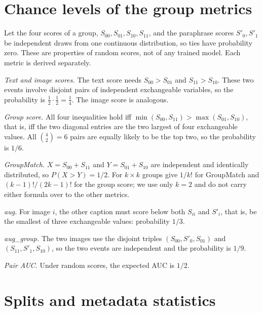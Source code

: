\section{Chance levels of the group metrics}
\label{app:chance}

Let the four scores of a group, $S_{00},S_{01},S_{10},S_{11}$, and the paraphrase scores
$S'_0,S'_1$ be independent draws from one continuous distribution, so ties have probability zero.
These are properties of random scores, not of any trained model. Each metric is derived separately.

\emph{Text and image scores.} The text score needs $S_{00}>S_{01}$ and $S_{11}>S_{10}$. These two
events involve disjoint pairs of independent exchangeable variables, so the probability is
$\tfrac12\cdot\tfrac12=\tfrac14$. The image score is analogous.

\emph{Group score.} All four inequalities hold iff $\min(S_{00},S_{11})>\max(S_{01},S_{10})$, that
is, iff the two diagonal entries are the two largest of four exchangeable values. All
$\binom{4}{2}=6$ pairs are equally likely to be the top two, so the probability is $1/6$.

\emph{GroupMatch.} $X=S_{00}+S_{11}$ and $Y=S_{01}+S_{10}$ are independent and identically
distributed, so $P(X>Y)=1/2$. For $k{\times}k$ groups \citet{zhu2025ttm} give $1/k!$ for GroupMatch
and $(k-1)!/(2k-1)!$ for the group score; we use only $k=2$ and do not carry either formula over to
the other metrics.

\emph{aug.} For image $i$, the other caption must score below both $S_{ii}$ and $S'_i$, that is, be
the smallest of three exchangeable values: probability $1/3$.

\emph{aug\_group.} The two images use the disjoint triples $(S_{00},S'_0,S_{01})$ and
$(S_{11},S'_1,S_{10})$, so the two events are independent and the probability is $1/9$.

\emph{Pair AUC.} Under random scores, the expected AUC is $1/2$.

\section{Splits and metadata statistics}
\label{app:splits}

